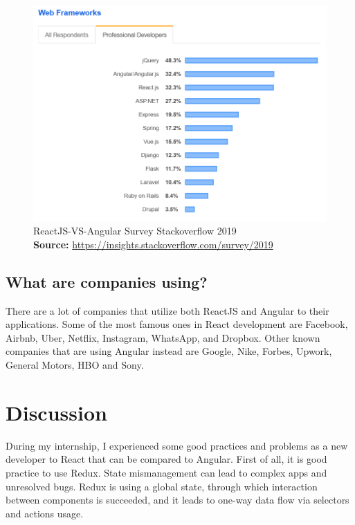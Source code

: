 \begin{figure}[H]
	\begin{center}
		\includegraphics[scale=0.5]{images/ReactJS-VS-Angular-Survey-Stackoverflow.png}
	\end{center}
	\caption{
		ReactJS-VS-Angular Survey Stackoverflow 2019
		\\
		\textbf{Source:} \url{https://insights.stackoverflow.com/survey/2019}
	}
\end{figure}

\subsection{What are companies using?}
There are a lot of companies that utilize both ReactJS and Angular to their applications. Some of the most famous ones in React development are Facebook, Airbnb, Uber, Netflix, Instagram, WhatsApp, and Dropbox. Other known companies that are using Angular instead are Google, Nike, Forbes, Upwork, General Motors, HBO and Sony.

\section{Discussion}

During my internship, I experienced some good practices and problems as a new developer to React that can be compared to Angular. First of all, it is good practice to use Redux. State mismanagement can lead to complex apps and unresolved bugs. Redux is using a global state, through which interaction between components is succeeded, and it leads to one-way data flow via selectors and actions usage. \par


